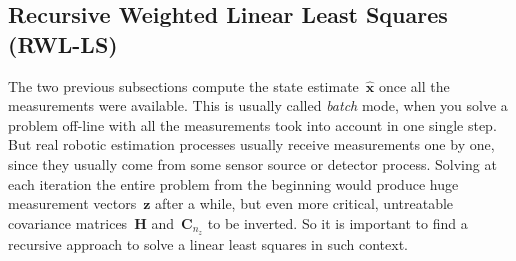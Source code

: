\subsection{Recursive Weighted Linear Least Squares (RWL-LS)}
\label{subsec:recursive_ls}
The two previous subsections compute the state estimate~$\hat{\mathbf{x}}$ once all the measurements were available. This is usually called \textit{batch} mode, when you solve a problem off-line with all the measurements took into account in one single step. But real robotic estimation processes usually receive measurements one by one, since they usually come from some sensor source or detector process. Solving at each iteration the entire problem from the beginning would produce huge measurement vectors~$\mathbf{z}$ after a while, but even more critical, untreatable covariance matrices~$\mathbf{H}$ and~$\mathbf{C}_{n_z}$ to be inverted. So it is important to find a recursive approach to solve a linear least squares in such context. 

